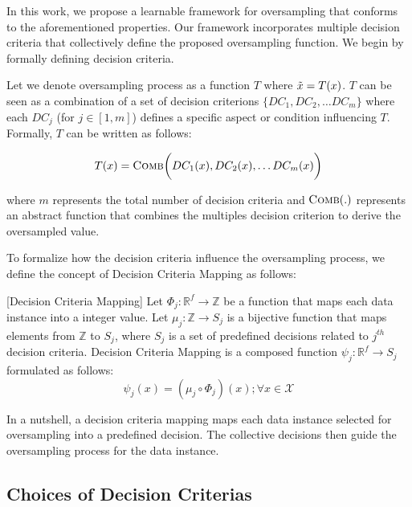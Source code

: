 In this work, we propose a learnable framework for oversampling that conforms to the aforementioned properties. Our framework incorporates multiple decision criteria that collectively define the proposed oversampling function. We begin by formally defining  decision criteria.

\begin{definition}  Let we denote oversampling process as a function $T$ where $\Tilde{x} = T (x)$. $T$ can be seen as a  combination of a set of decision criterions $\{DC_1, DC_2, \dots DC_m\}$ where each $DC_j$ (for $j \in [1, m]$) defines a specific aspect or condition influencing $T$. Formally, $T$ can be written as follows:

\[T(x)=\textsc{Comb}\bigg(DC_1(x), DC_2(x), \dots DC_m(x) \bigg) \]

where $m$ represents the total number of decision criteria and \( \textsc{Comb}(.) \) represents an abstract function that combines the multiples decision criterion to derive the oversampled value.
    
\end{definition}

To formalize how the decision criteria influence the oversampling process, we define the concept of Decision Criteria Mapping as follows:


\begin{definition} \label{def:dcm} [Decision Criteria Mapping] Let $\Phi_j : \mathbb{R}^{f} \rightarrow \mathbb{Z}$ be a function that maps each data instance into a integer value. Let \(\mu_j : \mathbb{Z} \rightarrow S_j\) is a bijective function that maps elements from \(\mathbb{Z}\) to \(S_j\), where \(S_j\) is a set of predefined decisions related to $j^{th}$ decision criteria. Decision Criteria Mapping is a composed function \(\psi_j : \mathbb{R}^f \rightarrow S_j\) formulated as follows:
\[
\psi_j(x) = (\mu_j \circ \Phi_j)(x); \forall x \in \mathcal{X}
\]
\end{definition}

In a nutshell, a decision criteria mapping maps each data instance selected for oversampling into a predefined decision. The collective decisions then guide the oversampling process for the data instance.

\subsection{Choices of Decision Criterias}


